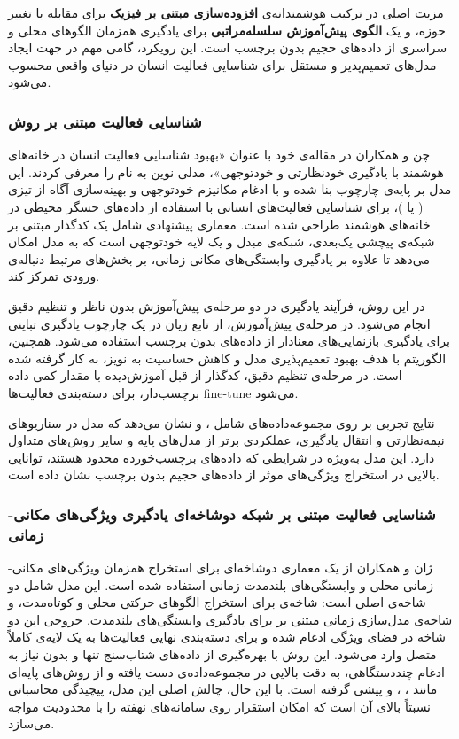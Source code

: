 مزیت اصلی  در ترکیب هوشمندانه‌ی \textbf{افزوده‌سازی مبتنی بر فیزیک} برای مقابله با تغییر حوزه، و یک \textbf{الگوی پیش‌آموزش سلسله‌مراتبی} برای یادگیری همزمان الگوهای محلی و سراسری از داده‌های حجیم بدون برچسب است. این رویکرد، گامی مهم در جهت ایجاد مدل‌های تعمیم‌پذیر و مستقل برای شناسایی فعالیت انسان در دنیای واقعی محسوب می‌شود.

\subsubsection{شناسایی فعالیت مبتنی بر روش }

چن و همکاران\cite{chen2024enhancing} در مقاله‌ی خود با عنوان «بهبود شناسایی فعالیت انسان در خانه‌های هوشمند با یادگیری خودنظارتی و خودتوجهی»، مدلی نوین به نام  را معرفی کردند. این مدل بر پایه‌ی چارچوب  بنا شده و با ادغام مکانیزم خودتوجهی و بهینه‌سازی آگاه از تیزی ( یا )، برای شناسایی فعالیت‌های انسانی با استفاده از داده‌های حسگر محیطی در خانه‌های هوشمند طراحی شده است. معماری پیشنهادی شامل یک کدگذار مبتنی بر شبکه‌ی پیچشی یک‌بعدی، شبکه‌ی مبدل و یک لایه خودتوجهی است که به مدل امکان می‌دهد تا علاوه بر یادگیری وابستگی‌های مکانی-زمانی، بر بخش‌های مرتبط دنباله‌ی ورودی تمرکز کند.

در این روش، فرآیند یادگیری در دو مرحله‌ی پیش‌آموزش بدون ناظر و تنظیم دقیق انجام می‌شود. در مرحله‌ی پیش‌آموزش، از تابع زیان  در یک چارچوب یادگیری تباینی برای یادگیری بازنمایی‌های معنادار از داده‌های بدون برچسب استفاده می‌شود. همچنین، الگوریتم  با هدف بهبود تعمیم‌پذیری مدل و کاهش حساسیت به نویز، به کار گرفته شده است. در مرحله‌ی تنظیم دقیق، کدگذار از قبل آموزش‌دیده با مقدار کمی داده برچسب‌دار، برای دسته‌بندی فعالیت‌ها fine-tune می‌شود.

نتایج تجربی بر روی مجموعه‌داده‌های  شامل ،  و  نشان می‌دهد که مدل  در سناریوهای نیمه‌نظارتی و انتقال یادگیری، عملکردی برتر از مدل‌های پایه و سایر روش‌های متداول دارد. این مدل به‌ویژه در شرایطی که داده‌های برچسب‌خورده محدود هستند، توانایی بالایی در استخراج ویژگی‌های موثر از داده‌های حجیم بدون برچسب نشان داده است.

\subsubsection{شناسایی فعالیت مبتنی بر شبکه دوشاخه‌ای یادگیری ویژگی‌های مکانی-زمانی}

ژان و همکاران \cite{zhan2025single} از یک معماری دوشاخه‌ای برای استخراج همزمان ویژگی‌های مکانی-زمانی محلی و وابستگی‌های بلندمدت زمانی استفاده شده است. این مدل شامل دو شاخه‌ی اصلی است: شاخه‌ی  برای استخراج الگوهای حرکتی محلی و کوتاه‌مدت، و شاخه‌ی مدل‌سازی زمانی مبتنی بر  برای یادگیری وابستگی‌های بلندمدت. خروجی این دو شاخه در فضای ویژگی ادغام شده و برای دسته‌بندی نهایی فعالیت‌ها به یک لایه‌ی کاملاً متصل وارد می‌شود. این روش با بهره‌گیری از داده‌های شتاب‌سنج تنها و بدون نیاز به ادغام چنددستگاهی، به دقت بالایی در مجموعه‌داده‌ی  دست یافته و از روش‌های پایه‌ای مانند ، ،  و  پیشی گرفته است. با این حال، چالش اصلی این مدل، پیچیدگی محاسباتی نسبتاً بالای آن است که امکان استقرار روی سامانه‌های نهفته را با محدودیت مواجه می‌سازد.


